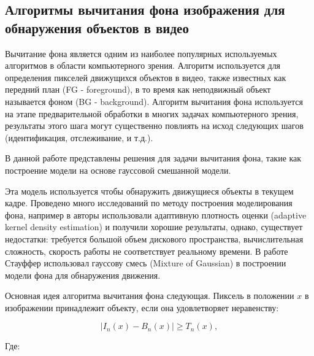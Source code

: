 \subsection{Алгоритмы вычитания фона изображения для обнаружения объектов в видео} \label{part2.2.2}
Вычитание фона является одним из наиболее популярных используемых алгоритмов в области компьютерного зрения. Алгоритм используется для определения пикселей движущихся объектов в видео, также известных как передний план (FG - foreground), в то время как неподвижный объект называется фоном (BG - background). Алгоритм вычитания фона используется на этапе предварительной обработки в многих задачах компьютерного зрения, результаты этого шага могут существенно повлиять на исход следующих шагов (идентификация, отслеживание, и т.д.).

В данной работе представлены решения для задачи вычитания фона, такие как построение модели на основе гауссовой смешанной модели.

Эта модель используется чтобы обнаружить движущиеся объекты в текущем кадре. Проведено много исследований по методу построения моделирования фона, например в \cite{Mittal2004} авторы использовали адаптивную плотность оценки (adaptive kernel density estimation) и получили хорошие результаты, однако, существует недостатки: требуется большой объем дискового пространства, вычислительная сложность, скорость работы не соответствует реальному времени. В работе \cite{Stauffer2009} Стауффер использовал гауссову смесь (Mixture of Gaussian) в построении модели фона для обнаружения движения. 

Основная идея алгоритма вычитания фона следующая. Пиксель в положении $x$ в изображении принадлежит объекту, если она удовлетворяет неравенству:

	\begin{equation}\label{eq8}
\left|I_n\left(x\right)-B_n\left(x\right)\right| \geq T_n\left(x\right),
\end{equation}

Где:

